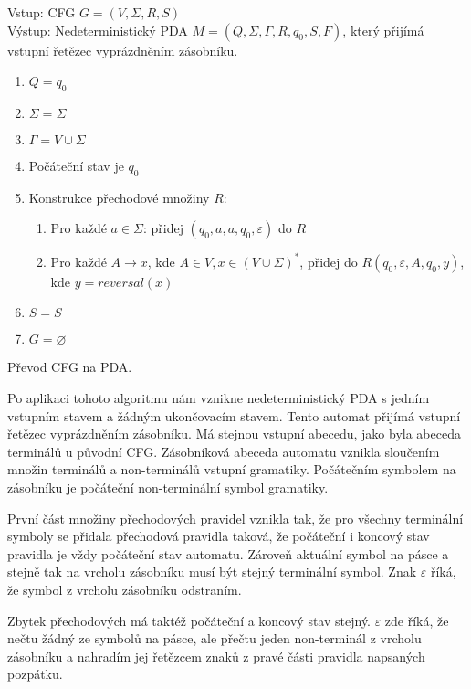 \begin{framed}
	Vstup: CFG \(G = (V,\Sigma, R, S) \)\\
	Výstup: Nedeterministický PDA \(M = (Q, \Sigma, \Gamma, R, q_0, S, F) \), který přijímá vstupní řetězec vyprázdněním zásobníku. 
	\begin{enumerate}
		\item \(Q = {q_0}\)
		\item \(\Sigma = \Sigma\)
		\item \(\Gamma = V \cup \Sigma \)
		\item Počáteční stav je \(q_0\)
		\item Konstrukce přechodové množiny \( R \):
		\begin{enumerate}
			\item Pro každé $a \in \Sigma$: přidej $(q_0,a,a,q_0,\varepsilon)$ do $R$
			\item Pro každé $A \rightarrow x$, kde $A \in V, x \in (V \cup \Sigma)^*$, přidej do $R (q_0, \varepsilon, A, q_0, y)$, 
			kde $y = reversal(x)$
		\end{enumerate}
		\item \(S = S\)
		\item $G = \varnothing$
	\end{enumerate}
\end{framed}
\begin{myAlgorithm}
	Převod CFG na PDA.
\end{myAlgorithm}

Po aplikaci tohoto algoritmu nám vznikne nedeterministický PDA s jedním vstupním stavem a žádným ukončovacím stavem. Tento automat přijímá vstupní řetězec vyprázdněním zásobníku. Má stejnou vstupní abecedu, jako byla abeceda terminálů u původní CFG. Zásobníková abeceda automatu vznikla sloučením množin terminálů a non-terminálů vstupní gramatiky. Počátečním symbolem na zásobníku je počáteční non-terminální symbol gramatiky. 

První část množiny přechodových pravidel vznikla tak, že pro všechny terminální symboly se přidala přechodová pravidla taková, že počáteční i koncový stav pravidla je vždy počáteční stav automatu. Zároveň aktuální symbol na pásce a stejně tak na vrcholu zásobníku musí být stejný terminální symbol. Znak $\varepsilon$ říká, že symbol z vrcholu zásobníku odstraním. 

Zbytek přechodových má taktéž počáteční a koncový stav stejný. $\varepsilon$ zde říká, že nečtu žádný ze symbolů na pásce, ale přečtu jeden non-terminál z vrcholu zásobníku a nahradím jej řetězcem znaků z pravé části pravidla napsaných pozpátku.  

